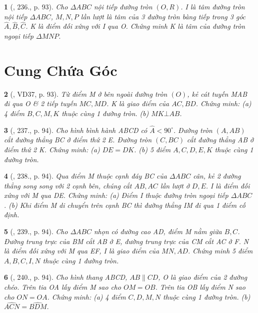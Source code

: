 \documentclass{article}
\newtheorem{baitoan}{}
\begin{document}
\begin{baitoan}[\cite{Binh_Toan_9_tap_2}, 236., p. 93]
	Cho $\Delta ABC$ nội tiếp đường tròn $(O,R)$. I là tâm đường tròn nội tiếp $\Delta ABC$, $M,N,P$ lần lượt là tâm của 3 đường tròn bàng tiếp trong 3 góc $\widehat{A},\widehat{B},\widehat{C}$. K là điểm đối xứng với I qua O. Chứng minh K là tâm của đường tròn ngoại tiếp $\Delta MNP$.
\end{baitoan}


\section{Cung Chứa Góc}

\begin{baitoan}[\cite{Binh_Toan_9_tap_2}, VD37, p. 93]
	Từ điểm M ở bên ngoài đường tròn $(O)$, kẻ cát tuyến MAB đi qua O \& 2 tiếp tuyến $MC,MD$. K là giao điểm của $AC,BD$. Chứng minh: (a) 4 điểm $B,C,M,K$ thuộc cùng 1 đường tròn. (b) $MK\bot AB$.
\end{baitoan}

\begin{baitoan}[\cite{Binh_Toan_9_tap_2}, 237., p. 94]
	Cho hình bình hành ABCD có $\widehat{A} < 90^\circ$. Đường tròn $(A,AB)$ cắt đường thẳng BC ở điểm thứ 2 E. Đường tròn $(C,BC)$ cắt đường thẳng AB ở điểm thứ 2 K. Chứng minh: (a) $DE = DK$. (b) 5 điểm $A,C,D,E,K$ thuộc cùng 1 đường tròn.
\end{baitoan}

\begin{baitoan}[\cite{Binh_Toan_9_tap_2}, 238., p. 94]
	Qua điểm M thuộc cạnh đáy BC của $\Delta ABC$ cân, kẻ 2 đường thẳng song song với 2 cạnh bên, chúng cắt $AB,AC$ lần lượt ở $D,E$. I là điểm đối xứng với M qua DE. Chứng minh: (a) Điểm I thuộc đường tròn ngoại tiếp $\Delta ABC$. (b) Khi điểm M di chuyển trên cạnh BC thì đường thẳng IM đi qua 1 điểm cố định.
\end{baitoan}

\begin{baitoan}[\cite{Binh_Toan_9_tap_2}, 239., p. 94]
	Cho $\Delta ABC$ nhọn có đường cao AD, điểm M nằm giữa $B,C$. Đường trung trực của BM cắt AB ở E, đường trung trực của CM cắt AC ở F. N là điểm đối xứng với M qua EF, I là giao điểm của $MN,AD$. Chứng minh 5 điểm $A,B,C,I,N$ thuộc cùng 1 đường tròn.
\end{baitoan}

\begin{baitoan}[\cite{Binh_Toan_9_tap_2}, 240., p. 94]
	Cho hình thang ABCD, $AB\parallel CD$, O là giao điểm của 2 đường chéo. Trên tia OA lấy điểm M sao cho $OM = OB$. Trên tia OB lấy điểm N sao cho $ON = OA$. Chứng minh: (a) 4 điểm $C,D,M,N$ thuộc cùng 1 đường tròn. (b) $\widehat{ACN} = \widehat{BDM}$.
\end{baitoan}
\end{document}
